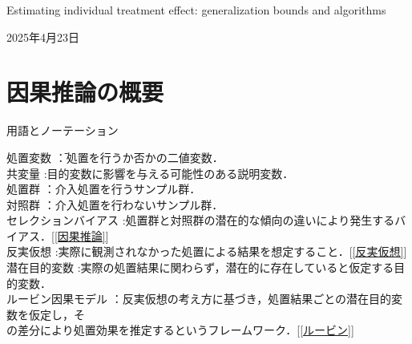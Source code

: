 \documentclass[dvipdfmx]{jreport}
\begin{document}
\begin{center}
    \large{Estimating individual treatment effect: generalization bounds and algorithms}
\end{center}

\begin{flushright}
    2025年4月23日
\end{flushright}

\section{因果推論の概要}
\begin{itembox}[l]{\large{用語とノーテーション}}
    \begin{tabbing}
        \hspace{15pt} \raisebox{0.5ex}{\tiny $\bullet$} 処置変数 \hspace{56pt}\=：処置を行うか否かの二値変数．\\[0.5em] 
        \hspace{15pt} \raisebox{0.5ex}{\tiny $\bullet$} 共変量 \>:目的変数に影響を与える可能性のある説明変数．\\[0.5em] 
        \hspace{15pt} \raisebox{0.5ex}{\tiny $\bullet$} 処置群 \>：介入処置を行うサンプル群．\\[0.5em]
        \hspace{15pt} \raisebox{0.5ex}{\tiny $\bullet$} 対照群 \>：介入処置を行わないサンプル群．\\[0.5em]        
        \hspace{15pt} \raisebox{0.5ex}{\tiny $\bullet$} セレクションバイアス \>:処置群と対照群の潜在的な傾向の違いにより発生するバイアス．[\ref{因果推論}]\\[0.5em] 
        \hspace{15pt} \raisebox{0.5ex}{\tiny $\bullet$} 反実仮想 \>:実際に観測されなかった処置による結果を想定すること．[\ref{反実仮想}]\\[0.5em]
        \hspace{15pt} \raisebox{0.5ex}{\tiny $\bullet$} 潜在目的変数 \>:実際の処置結果に関わらず，潜在的に存在していると仮定する目的変数．\\[0.5em] 
        \hspace{15pt} \raisebox{0.5ex}{\tiny $\bullet$} ルービン因果モデル \>：反実仮想の考え方に基づき，処置結果ごとの潜在目的変数を仮定し，そ\\[0.5em]\>\hspace{6.5pt}の差分により処置効果を推定するというフレームワーク．[\ref{ルービン}]\\[0.5em]

\end{tabbing}
\end{itembox}
\end{document}
